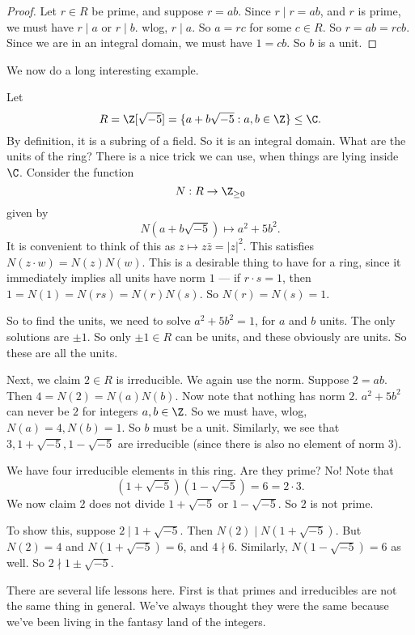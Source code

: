 \documentclass[a4paper]{article}
\begin{document}
\begin{proof}
  Let $r \in R$ be prime, and suppose $r = ab$. Since $r \mid r = ab$, and $r$ is prime, we must have $r \mid a$ or $r \mid b$. wlog, $r\mid a$. So $a = rc$ for some $c \in R$. So $r = ab = rcb$. Since we are in an integral domain, we must have $1 = cb$. So $b$ is a unit.
\end{proof}

We now do a long interesting example.
\begin{eg}
  Let
  \[
    R = \Z[\sqrt{-5}] = \{a + b\sqrt{-5}: a, b\in \Z\} \leq \C.
  \]
  By definition, it is a subring of a field. So it is an integral domain. What are the units of the ring? There is a nice trick we can use, when things are lying inside $\C$. Consider the function
  \[
    N: R \to \Z_{\geq 0}
  \]
  given by
  \[
    N(a + b\sqrt{-5}) \mapsto a^2 + 5b^2.
  \]
  It is convenient to think of this as $z \mapsto z\bar{z} = |z|^2$. This satisfies $N(z \cdot w) = N(z) N(w)$. This is a desirable thing to have for a ring, since it immediately implies all units have norm $1$ --- if $r \cdot s = 1$, then $1 = N(1) = N(rs) = N(r)N(s)$. So $N(r)=N(s) = 1$.

  So to find the units, we need to solve $a^2 + 5b^2 = 1$, for $a$ and $b$ units. The only solutions are $\pm 1$. So only $\pm 1 \in R$ can be units, and these obviously are units. So these are all the units.

  Next, we claim $2 \in R$ is irreducible. We again use the norm. Suppose $2 = ab$. Then $4 = N(2) = N(a)N(b)$. Now note that nothing has norm $2$. $a^2 + 5b^2$ can never be $2$ for integers $a, b \in \Z$. So we must have, wlog, $N(a) = 4, N(b) = 1$. So $b$ must be a unit. Similarly, we see that $3, 1 + \sqrt{-5}, 1 - \sqrt{-5}$ are irreducible (since there is also no element of norm $3$).

  We have four irreducible elements in this ring. Are they prime? No! Note that
  \[
    (1 + \sqrt{-5})(1 - \sqrt{-5}) = 6 = 2\cdot 3.
  \]
  We now claim $2$ does not divide $1 + \sqrt{-5}$ or $1 - \sqrt{-5}$. So $2$ is not prime.

  To show this, suppose $2 \mid 1 + \sqrt{-5}$. Then $N(2) \mid N(1 + \sqrt{-5})$. But $N(2) = 4$ and $N(1 + \sqrt{-5}) = 6$, and $4 \nmid 6$. Similarly, $N(1 - \sqrt{-5}) = 6$ as well. So $2 \nmid 1 \pm \sqrt{-5}$.
\end{eg}
There are several life lessons here. First is that primes and irreducibles are not the same thing in general. We've always thought they were the same because we've been living in the fantasy land of the integers.
\end{document}
